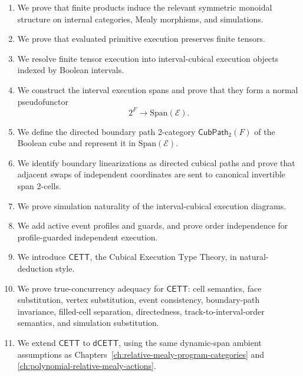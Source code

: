 \begin{enumerate}
    \item We prove that finite products induce the relevant symmetric
    monoidal structure on internal categories, Mealy morphisms, and
    simulations.

    \item We prove that evaluated primitive execution preserves finite
    tensors.

    \item We resolve finite tensor execution into interval-cubical execution
    objects indexed by Boolean intervals.

    \item We construct the interval execution spans and prove that they form a
    normal pseudofunctor
    \[
        2^F\to\mathrm{Span}(\mathcal E).
    \]

    \item We define the directed boundary path 2-category
    \(\mathsf{CubPath}_2(F)\) of the Boolean cube and represent it in
    \(\mathrm{Span}(\mathcal E)\).

    \item We identify boundary linearizations as directed cubical paths and
    prove that adjacent swaps of independent coordinates are sent to
    canonical invertible span 2-cells.

    \item We prove simulation naturality of the interval-cubical execution
    diagrams.

    \item We add active event profiles and guards, and prove order
    independence for profile-guarded independent execution.

    \item We introduce \(\mathsf{CETT}\), the Cubical Execution Type Theory,
    in natural-deduction style.

    \item We prove true-concurrency adequacy for \(\mathsf{CETT}\): cell
    semantics, face substitution, vertex substitution, event consistency,
    boundary-path invariance, filled-cell separation, directedness,
    track-to-interval-order semantics, and simulation substitution.

    \item We extend \(\mathsf{CETT}\) to \(\mathsf{dCETT}\), using the same
    dynamic-span ambient assumptions as
    Chapters~\ref{ch:relative-mealy-program-categories} and
    \ref{ch:polynomial-relative-mealy-actions}.


\end{enumerate}
